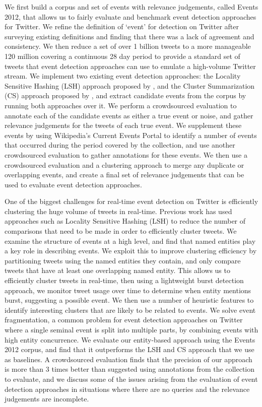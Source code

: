 We first build a corpus and set of events with relevance judgements, called Events 2012, that allows us to fairly evaluate and benchmark event detection approaches for Twitter.
We refine the definition of `event' for detection on Twitter after surveying existing definitions and finding that there was a lack of agreement and consistency.
We then reduce a set of over 1 billion tweets to a more manageable 120 million covering a continuous 28 day period to provide a standard set of tweets that event detection approaches can use to emulate a high-volume Twitter stream.
We implement two existing event detection approaches: the Locality Sensitive Hashing (LSH) approach proposed by \cite{Petrovic10}, and the Cluster Summarization (CS) approach proposed by \cite{Aggarwal12}, and extract candidate events from the corpus by running both approaches over it.
We perform a crowdsourced evaluation to annotate each of the candidate events as either a true event or noise, and gather relevance judgements for the tweets of each true event.
We supplement these events by using Wikipedia's Current Events Portal to identify a number of events that occurred during the period covered by the collection, and use another crowdsourced evaluation to gather annotations for these events.
We then use a crowdsourced evaluation and a clustering approach to merge any duplicate or overlapping events, and create a final set of relevance judgements that can be used to evaluate event detection approaches.

One of the biggest challenges for real-time event detection on Twitter is efficiently clustering the huge volume of tweets in real-time.
Previous work has used approaches such as Locality Sensitive Hashing (LSH) \citep{Petrovic10} to reduce the number of comparisons that need to be made in order to efficiently cluster tweets.
We examine the structure of events at a high level, and find that named entities play a key role in describing events.
We exploit this to improve clustering efficiency by partitioning tweets using the named entities they contain, and only compare tweets that have at least one overlapping named entity.
This allows us to efficiently cluster tweets in real-time, then using a lightweight burst detection approach, we monitor tweet usage over time to determine when entity mentions burst, suggesting a possible event.
We then use a number of heuristic features to identify interesting clusters that are likely to be related to events.
We solve event fragmentation, a common problem for event detection approaches on Twitter where a single seminal event is split into multiple parts, by combining events with high entity concurrence.
We evaluate our entity-based approach using the Events 2012 corpus, and find that it outperforms the LSH and CS approach that we use as baselines.
A crowdsourced evaluation finds that the precision of our approach is more than 3 times better than suggested using annotations from the collection to evaluate, and we discuss some of the issues arising from the evaluation of event detection approaches in situations where there are no queries and the relevance judgements are incomplete.

